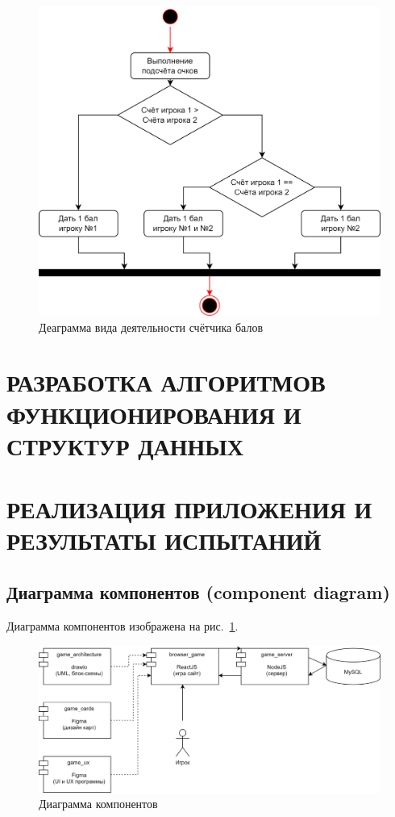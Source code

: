 \documentclass[12pt, a4paper, simple]{eskdtext}
\begin{document}
    \begin{figure}[!h]
        \centering
        \includegraphics[]
            {../sources/game_architecture/build/game__activity_diagram.png}
        \caption{Деаграмма вида деятельности счётчика балов}
    \end{figure}

    \newpage
    
    \section{РАЗРАБОТКА АЛГОРИТМОВ ФУНКЦИОНИРОВАНИЯ И СТРУКТУР ДАННЫХ}
    \newpage
    
    \section{РЕАЛИЗАЦИЯ ПРИЛОЖЕНИЯ И РЕЗУЛЬТАТЫ ИСПЫТАНИЙ}
    \subsection{Диаграмма компонентов (component diagram)}

    Диаграмма компонентов изображена на рис.~\ref{fig:game__component_diagram}.

    \begin{figure}[!h]
        \centering
        \includegraphics[width=16cm]
            {../sources/game_architecture/build/game__component_diagram.png}
        \caption{Диаграмма компонентов}
        \label{fig:game__component_diagram}
    \end{figure}
\end{document}
